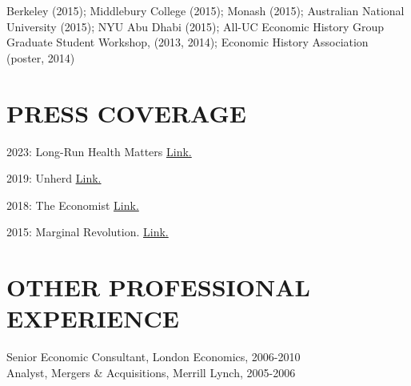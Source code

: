 \documentclass{res}  %
\begin{document}
\begin{resume}
Berkeley (2015); Middlebury College (2015); Monash (2015); Australian National University (2015); NYU Abu Dhabi (2015); All-UC Economic History Group Graduate Student Workshop, (2013, 2014); Economic History Association (poster, 2014)


\section{PRESS COVERAGE}
2023: Long-Run Health Matters  \href{https://lrhmatters.com/drivers-of-health/cheap-borrowing-saves-lives/}{\underline{Link}.} 

2019: Unherd \href{https://unherd.com/2019/04/crony-capitalism-is-empowering-the-left/}{\underline{Link}.}

2018: The Economist \href{https://www.economist.com/finance-and-economics/2019/04/04/rising-inequality-could-explain-tepid-support-for-redistribution}{\underline{Link}.}

2015: Marginal Revolution. \href{https://marginalrevolution.com/marginalrevolution/2014/11/was-it-the-middle-class-that-favored-infrastructure-investment-in-19th-century-england.html}{\underline{Link}.}


\vspace{5mm}
\section{OTHER PROFESSIONAL EXPERIENCE}
	Senior Economic Consultant, London Economics, 2006-2010 \\
	Analyst, Mergers \& Acquisitions, Merrill Lynch, 2005-2006
	
\end{resume} 
\end{document}
